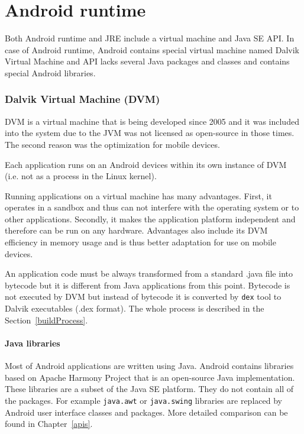 \section{Android runtime}\label{AndroidRuntime}
Both Android runtime and JRE include a virtual machine and Java SE API. In case of Android runtime, Android contains special virtual machine named Dalvik Virtual Machine and API lacks several Java packages and classes and contains special Android libraries.

\subsubsection{Dalvik Virtual Machine (DVM)}
DVM is a virtual machine that is being developed since 2005 and it was included into the system due to the JVM was not licensed as open-source in those times. The second reason was the optimization for mobile devices. 

Each application runs on an Android devices within its own instance of DVM (i.e. not as a process in the Linux kernel).

Running applications on a virtual machine has many advantages. First, it operates in a sandbox and thus can not interfere with the operating system or to other applications. Secondly, it makes the application platform independent and therefore can be run on any hardware. Advantages also include its DVM efficiency in memory usage and is thus better adaptation for use on mobile devices.

An application code must be always transformed from a standard .java file into bytecode but it is different from Java applications from this point. Bytecode is not executed by DVM but instead of bytecode it is converted by \texttt{dex} tool to Dalvik executables (.dex format). The whole process is described in the Section~\ref{buildProcess}.


\paragraph{Java libraries}
Most of Android applications are written using Java. Android contains libraries based on Apache Harmony Project that is an open-source Java implementation. These libraries are a subset of the Java SE platform. They do not contain all of the packages. For example \texttt{java.awt} or \texttt{java.swing} libraries are replaced by Android user interface classes and packages. More detailed comparison can be found in Chapter~\ref{apis}.


